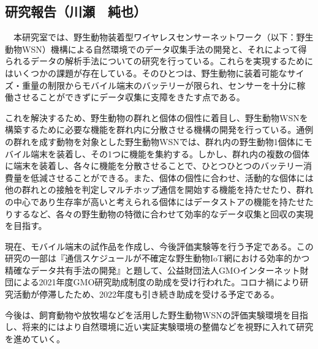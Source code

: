 \subsection{研究報告（川瀬　純也）}
　本研究室では、野生動物装着型ワイヤレスセンサーネットワーク（以下：野生動物WSN）機構による自然環境でのデータ収集手法の開発と、それによって得られるデータの解析手法についての研究を行っている。これらを実現するためにはいくつかの課題が存在している。そのひとつは、野生動物に装着可能なサイズ・重量の制限からモバイル端末のバッテリーが限られ、センサーを十分に稼働させることができずにデータ収集に支障をきたす点である。
 
これを解決するため、野生動物の群れと個体の個性に着目し、野生動物WSNを構築するために必要な機能を群れ内に分散させる機構の開発を行っている。通例の群れを成す動物を対象とした野生動物WSNでは、群れ内の野生動物1個体にモバイル端末を装着し、その1つに機能を集約する。しかし、群れ内の複数の個体に端末を装着し、各々に機能を分散させることで、ひとつひとつのバッテリー消費量を低減させることができる。また、個体の個性に合わせ、活動的な個体には他の群れとの接触を判定しマルチホップ通信を開始する機能を持たせたり、群れの中心であり生存率が高いと考えられる個体にはデータストアの機能を持たせたりするなど、各々の野生動物の特徴に合わせて効率的なデータ収集と回収の実現を目指す。
 
現在、モバイル端末の試作品を作成し、今後評価実験等を行う予定である。この研究の一部は『通信スケジュールが不確定な野生動物IoT網における効率的かつ精確なデータ共有手法の開発』と題して、公益財団法人GMOインターネット財団による2021年度GMO研究助成制度の助成を受け行われた。コロナ禍により研究活動が停滞したため、2022年度も引き続き助成を受ける予定である。
 
今後は、飼育動物や放牧場などを活用した野生動物WSNの評価実験環境を目指し、将来的にはより自然環境に近い実証実験環境の整備などを視野に入れて研究を進めていく。
